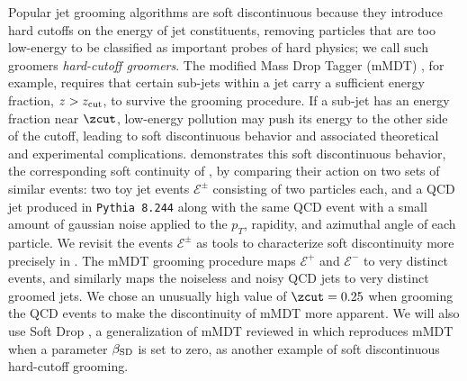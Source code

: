 \documentclass[letterpaper,11pt]{article}
\begin{document}
Popular jet grooming algorithms are soft discontinuous because they introduce hard cutoffs on the energy of jet constituents, removing particles that are too low-energy to be classified as important probes of hard physics;
%
we call such groomers \textit{hard-cutoff groomers}.
%
The modified Mass Drop Tagger (mMDT) \cite{Dasgupta:2013ihk}, for example, requires that certain sub-jets within a jet carry a sufficient energy fraction, \(z > z_{\rm cut}\), to survive the grooming procedure.
%
If a sub-jet has an energy fraction near \(\zcut\), low-energy pollution may push its energy to the other side of the cutoff, leading to soft discontinuous behavior and associated theoretical and experimental complications.
%
 demonstrates this soft discontinuous behavior, the corresponding soft continuity of , by comparing their action on two sets of similar events:
%
two toy jet events \(\mathcal{E}^\pm\) consisting of two particles each, and a QCD jet produced in \texttt{Pythia 8.244} along with the same QCD event with a small amount of gaussian noise applied to the \(p_T\), rapidity, and azimuthal angle of each particle.
%
We revisit the events \(\mathcal{E}^\pm\) as tools to characterize soft discontinuity more precisely in .
%
The mMDT grooming procedure maps \(\mathcal{E}^+\) and \(\mathcal{E}^-\) to very distinct events, and similarly maps the noiseless and noisy QCD jets to very distinct groomed jets.
%
We chose an unusually high value of \(\zcut = 0.25\) when grooming the QCD events to make the discontinuity of mMDT more apparent.
%
We will also use Soft Drop \cite{Larkoski:2014wba}, a generalization of mMDT reviewed in  which reproduces mMDT when a parameter \(\beta_{\rm SD}\) is set to zero, as another example of soft discontinuous hard-cutoff grooming.
\end{document}

